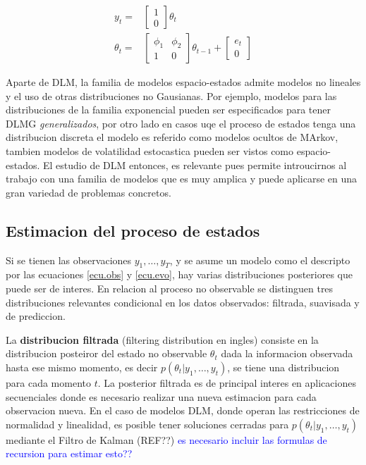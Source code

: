 \documentclass[12pt]{article}\usepackage[]{graphicx}\usepackage[]{color}
\begin{document}
\[ \begin{array}{ll}
y_t = & \begin{bmatrix}
1 \\
0
\end{bmatrix}
\theta_t \\
\theta_t = &
\begin{bmatrix}
\phi_1 & \phi_2 \\
1 & 0
\end{bmatrix}
\theta_{t-1}
+
\begin{bmatrix}
e_t \\
0
\end{bmatrix}
\end{array}
\]

Aparte de DLM, la familia de modelos espacio-estados admite modelos no lineales y el uso de otras distribuciones no Gausianas. Por ejemplo, modelos para las distribuciones de la familia exponencial pueden ser especificados para tener DLMG \textit{generalizados}, por otro lado en casos uqe el proceso de estados tenga una distribucion discreta el modelo es referido como modelos ocultos de MArkov, tambien modelos de volatilidad estocastica pueden ser vistos como espacio-estados. El estudio de DLM entonces, es relevante pues permite introucirnos al trabajo con una familia de modelos que es muy amplica y puede aplicarse en una gran variedad de problemas concretos. 



\subsection{Estimacion del proceso de estados}

Si se tienen las observaciones $y_1,\dots,y_T$, y se asume un modelo como el descripto por las ecuaciones \eqref{ecu.obs} y \eqref{ecu.evo}, hay varias distribuciones posteriores que puede ser de interes. En relacion al proceso no observable se distinguen tres distribuciones relevantes condicional en los datos observados: filtrada, suavisada y de prediccion. 

La \textbf{distribucion filtrada} (filtering distribution en ingles) consiste en la distribucion posteiror del estado no observable $\theta_t$ dada la informacion observada hasta ese mismo momento, es decir $p(\theta_t | y_1, \ldots, y_t)$, se tiene una distribucion para cada momento $t$. La posterior filtrada es de principal interes en aplicaciones secuenciales donde es necesario realizar una nueva estimacion para cada observacion nueva. En el caso de modelos DLM, donde operan las restricciones de normalidad y linealidad, es posible tener soluciones cerradas para $p(\theta_t | y_1, \ldots, y_t)$ mediante el Filtro de Kalman (REF??) \textcolor{blue}{es necesario incluir las formulas de recursion para estimar esto??}
\end{document}
